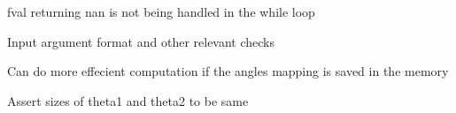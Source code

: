 \begin{DoxyRefList}
fval returning nan is not being handled in the while loop 

Input argument format and other relevant checks  
\item[Member \mbox{\hyperlink{utils_8hh_aa55cfeada673b3ce1ce1e504925e117c}{s1\+Dist}} (Vector\+Xd theta1, Vector\+Xd theta2)]\label{todo__todo000007}%
%
Can do more effecient computation if the angles mapping is saved in the memory 

Assert sizes of theta1 and theta2 to be same 
\end{DoxyRefList}